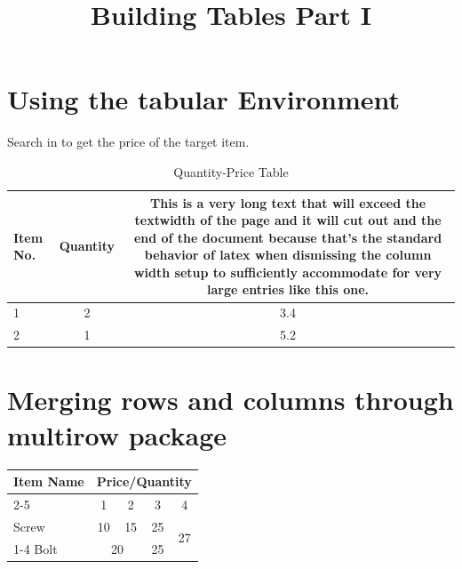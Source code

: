 \documentclass{article}
\title{\Huge Building Tables Part I}
\date{}
\begin{document}
	\maketitle
	
	\section{Using the tabular Environment}
	\kant[1] 
	\medskip
	Search in  to get the price of the 
		target item.
	\begin{table}[h]
		\centering
		\begin{tabular}{|l|c|c|}
			\hline
			Item No. & Quantity & 
			This is a very long text that will exceed
			the textwidth of the page and it will 
			cut out and the end of the document 
			because that's the standard behavior of
			latex when dismissing the column width
			setup to sufficiently accommodate for
			very large entries like this one.\\
			\hline
			1		 & 2		& 3.4 	\\
			\hline
			2		 & 1		& 5.2	\\
			\hline 
		\end{tabular}
		\caption{Quantity-Price Table}
		\label{tbl:qptbl}
	\end{table}
	
	\section{Merging rows and columns through multirow 				package}
	\begin{tabular}{|l|*{4}{c|}}
		\hline
		\multirow{2}{*}{Item Name} &
			\multicolumn{4}{c|}{Price/Quantity} \\
		\cline{2-5}
		& 1 & 2 & 3 & 4 \\ 
		\hline
		Screw & 10 & 15 & 25 & \multirow{2}{*}{27} \\
		\cline{1-4}
		Bolt & \multicolumn{2}{c|}{20} & 25 &  \\
		\hline %
	\end{tabular}
\end{document}

